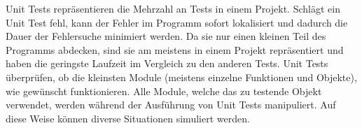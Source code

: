 Unit Tests repräsentieren die Mehrzahl an Tests in einem Projekt. Schlägt ein Unit Test fehl, 
kann der Fehler im Programm sofort lokalisiert und dadurch die Dauer der Fehlersuche minimiert werden.
Da sie nur einen kleinen Teil des Programms abdecken, 
sind sie am meistens in einem Projekt repräsentiert und haben die geringste Laufzeit im Vergleich zu den anderen Tests.
Unit Tests überprüfen, ob die kleinsten Module (meistens einzelne Funktionen und Objekte), 
wie gewünscht funktionieren. 
Alle Module, welche das zu testende Objekt verwendet, werden während der Ausführung von Unit Tests manipuliert.
Auf diese Weise können diverse Situationen simuliert werden.